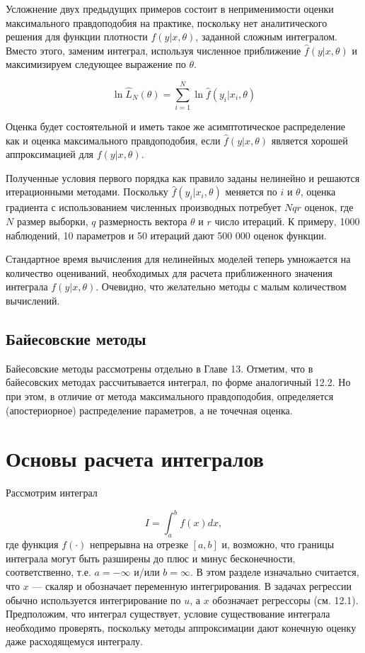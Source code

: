 Усложнение двух предыдущих примеров состоит в неприменимости оценки максимального правдоподобия на практике, поскольку нет аналитического решения для функции плотности $f(y|x,\theta)$, заданной сложным интегралом. Вместо этого, заменим интеграл, используя численное приближение $\hat{f}(y|x,\theta)$ и максимизируем следующее выражение по $\theta$.

\[
\ln\hat{L}_N(\theta)=\sum^{N}_{i=1}\ln\hat{f}(y_i|x_i,\theta)
\]

Оценка будет состоятельной и иметь такое же асимптотическое распределение как и оценка максимального правдоподобия, если $\hat{f}(y|x,\theta)$ является хорошей аппроксимацией для $f(y|x,\theta)$.

Полученные условия первого порядка как правило заданы нелинейно и решаются итерационными методами. Поскольку $\hat{f}(y_{i}|x_{i},\theta)$ меняется по $i$ и $\theta$, оценка градиента с использованием численных производных потребует $Nqr$ оценок, где $N$ размер выборки, $q$ размерность вектора $\theta$ и $r$ число итераций. К примеру, 1000 наблюдений, 10 параметров и 50 итераций дают 500 000 оценок функции. 

Стандартное время вычисления для нелинейных моделей теперь умножается на количество оцениваний, необходимых для расчета приближенного значения интеграла $f(y|x,\theta)$. Очевидно, что желательно методы с малым количеством вычислений. 

\subsection{Байесовские методы}

Байесовские методы рассмотрены отдельно в Главе 13. Отметим, что в байесовских методах рассчитывается интеграл, по форме аналогичный 12.2. Но при этом, в отличие от метода максимального правдоподобия, определяется (апостериорное) распределение параметров, а не точечная оценка.

\section{Основы расчета интегралов}

Рассмотрим интеграл

\begin{equation}
I=\int^{b}_{a}f(x)dx,
\end{equation}
где функция $f(\cdot)$ непрерывна на отрезке $[a,b]$ и, возможно, что границы интеграла могут быть разширены до плюс и минус бесконечности, соответственно, т.е. $a=-\infty$ и/или $b=\infty$. В этом разделе изначально считается, что $x$ --- скаляр и обозначает переменную интегрирования. В задачах регрессии обычно используется интегрирование по $u$, а $x$ обозначает регрессоры (см. 12.1). Предположим, что интеграл существует, условие существование интеграла необходимо проверять, поскольку методы аппроксимации дают конечную оценку даже расходящемуся интегралу.

